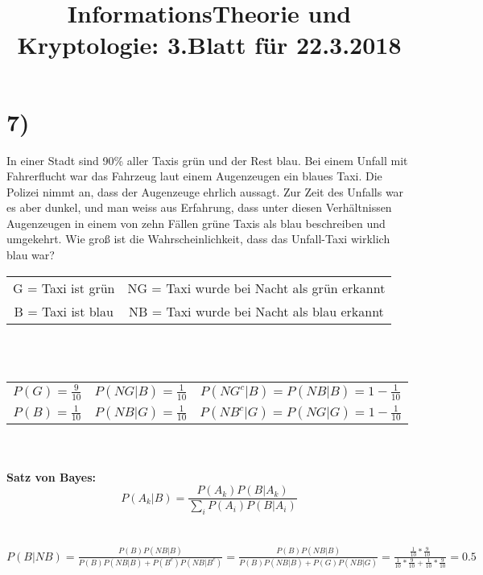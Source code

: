 \documentclass[11pt,a4paper]{article}
\author{}
\begin{document}
	\title{InformationsTheorie und Kryptologie: 3.Blatt für 22.3.2018}
	\maketitle

	\section*{7)}

	In einer Stadt sind 90\% aller Taxis grün und der Rest blau. Bei einem Unfall mit Fahrerflucht war das Fahrzeug laut einem Augenzeugen ein blaues Taxi. Die Polizei nimmt an, dass der Augenzeuge ehrlich aussagt. Zur Zeit des Unfalls war es aber dunkel, und man weiss aus Erfahrung, dass unter diesen Verhältnissen Augenzeugen in einem von zehn Fällen grüne Taxis als blau beschreiben und umgekehrt. Wie groß ist die Wahrscheinlichkeit, dass das Unfall-Taxi wirklich blau war?\\
	\newline
	\begin{tabular}{cc}
		G = Taxi ist grün & NG = Taxi wurde bei Nacht als grün erkannt \\
		B = Taxi ist blau & NB = Taxi wurde bei Nacht als blau erkannt \\
	\end{tabular} \\
	\\
	\begin{tabular}{c|c|c}
		\(P(G) = \frac{9}{10}\) & \(P(NG|B) = \frac{1}{10}\) & \(P(NG^c|B) = P(NB|B) = 1 - \frac{1}{10}\) \\
		\(P(B) = \frac{1}{10}\) & \(P(NB|G) = \frac{1}{10}\) & \(P(NB^c|G) = P(NG|G) = 1 - \frac{1}{10}\) \\
	\end{tabular} \\
	\\
	\textbf{Satz von Bayes:}\\
	\[P(A_k|B) = \frac{P(A_k)P(B|A_k)}{\sum_{i}^{}P(A_i)P(B|A_i)} \]\\
	\\
	\(P(B|NB) = \frac{P(B)P(NB|B)}{P(B)P(NB|B) + P(B^c)P(NB|B^c)} = \frac{P(B)P(NB|B)}{P(B)P(NB|B) + P(G)P(NB|G)} = \frac{\frac{1}{10}*\frac{9}{10}}{\frac{1}{10}*\frac{9}{10} + \frac{1}{10}*\frac{9}{10}} = 0.5 \) \\

	\newpage
\end{document}
